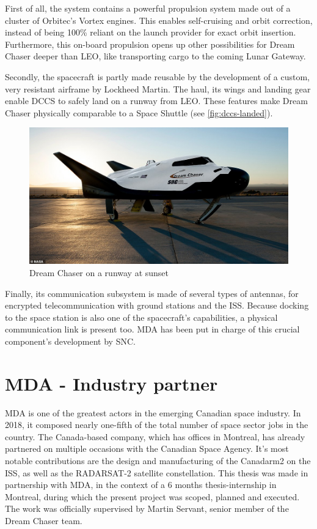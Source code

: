 First of all, the system contains a powerful propulsion system made out of a cluster of Orbitec's Vortex engines\cite{online:messier}. This enables self-cruising and orbit correction, instead of being 100\% reliant on the launch provider for exact orbit insertion. Furthermore, this on-board propulsion opens up other possibilities for Dream Chaser deeper than \gls{LEO}, like transporting cargo to the coming Lunar Gateway\cite{online:foust}.

Secondly, the  spacecraft is partly made reusable by the development of a custom, very resistant airframe by Lockheed Martin. The haul, its wings and landing gear enable \gls{DCCS} to safely land on a runway from \gls{LEO}. These features make Dream Chaser physically comparable to a Space Shuttle (see \autoref{fig:dccs-landed}). 
\begin{figure}[H]
	\vspace{12pt}
	\centering
	\includegraphics[width=0.9\linewidth, keepaspectratio]{art/dream-chaser-landed.jpg}
	\caption{Dream Chaser on a runway at sunset \cite{misc:dccs-landed}}
	\label{fig:dccs-landed}
\end{figure}
Finally, its communication subsystem is made of several types of antennas, for encrypted telecommunication with ground stations and the \gls{ISS}. Because docking to the space station is also one of the spacecraft's capabilities, a physical communication link is present too. \gls{MDA} has been put in charge of this crucial component's development by \gls{SNC}. 

\section{MDA - Industry partner}
\gls{MDA} is one of the greatest actors in the emerging Canadian space industry. In 2018, it composed nearly one-fifth of the total number of space sector jobs in the country\cite{online:mda-front-page}\cite{misc:canada-space-industry-report}. The Canada-based company, which has offices in Montreal, has already partnered on multiple occasions with the Canadian Space Agency. It's most notable contributions are the design and manufacturing of the Canadarm2 on the \gls{ISS}, as well as the RADARSAT-2 satellite constellation. This thesis was made in partnership with \gls{MDA}, in the context of a 6 months thesis-internship in Montreal, during which the present project was scoped, planned and executed. The work was officially supervised by Martin Servant, senior member of the Dream Chaser team. 

